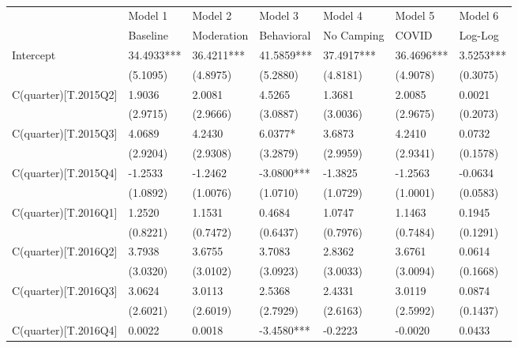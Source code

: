 \begin{table}
\caption{}
\label{}
\begin{center}
\begin{tabular}{lllllll}
\hline
                         & Model 1    & Model 2    & Model 3    & Model 4    & Model 5    & Model 6     \\
                         & Baseline   & Moderation & Behavioral & No Camping & COVID      & Log-Log     \\
\hline
Intercept                & 34.4933*** & 36.4211*** & 41.5859*** & 37.4917*** & 36.4696*** & 3.5253***   \\
                         & (5.1095)   & (4.8975)   & (5.2880)   & (4.8181)   & (4.9078)   & (0.3075)    \\
C(quarter)[T.2015Q2]     & 1.9036     & 2.0081     & 4.5265     & 1.3681     & 2.0085     & 0.0021      \\
                         & (2.9715)   & (2.9666)   & (3.0887)   & (3.0036)   & (2.9675)   & (0.2073)    \\
C(quarter)[T.2015Q3]     & 4.0689     & 4.2430     & 6.0377*    & 3.6873     & 4.2410     & 0.0732      \\
                         & (2.9204)   & (2.9308)   & (3.2879)   & (2.9959)   & (2.9341)   & (0.1578)    \\
C(quarter)[T.2015Q4]     & -1.2533    & -1.2462    & -3.0800*** & -1.3825    & -1.2563    & -0.0634     \\
                         & (1.0892)   & (1.0076)   & (1.0710)   & (1.0729)   & (1.0001)   & (0.0583)    \\
C(quarter)[T.2016Q1]     & 1.2520     & 1.1531     & 0.4684     & 1.0747     & 1.1463     & 0.1945      \\
                         & (0.8221)   & (0.7472)   & (0.6437)   & (0.7976)   & (0.7484)   & (0.1291)    \\
C(quarter)[T.2016Q2]     & 3.7938     & 3.6755     & 3.7083     & 2.8362     & 3.6761     & 0.0614      \\
                         & (3.0320)   & (3.0102)   & (3.0923)   & (3.0033)   & (3.0094)   & (0.1668)    \\
C(quarter)[T.2016Q3]     & 3.0624     & 3.0113     & 2.5368     & 2.4331     & 3.0119     & 0.0874      \\
                         & (2.6021)   & (2.6019)   & (2.7929)   & (2.6163)   & (2.5992)   & (0.1437)    \\
C(quarter)[T.2016Q4]     & 0.0022     & 0.0018     & -3.4580*** & -0.2223    & -0.0020    & 0.0433      \\

\end{tabular}
\end{center}
\end{table}
